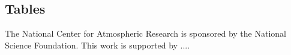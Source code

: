 \documentclass[12pt]{article}
\begin{document}
\subsection{Tables}



\begin{acknowledgment}
The National Center for Atmospheric Research is sponsored by the National
Science Foundation.  This work is supported by ....
\end{acknowledgment}


{}
{\clearpage}


%
\end{document}
